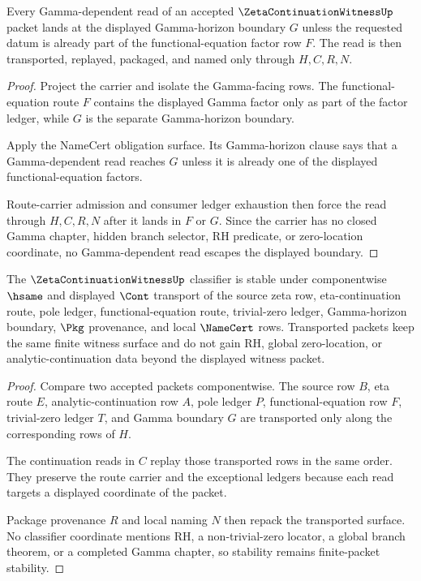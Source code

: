 \begin{theorem}
\label{thm:zeta-continuation-witness-gamma-horizon-nonescape-row}
Every Gamma-dependent read of an accepted $\ZetaContinuationWitnessUp$ packet lands at the displayed Gamma-horizon boundary $G$ unless the requested datum is already part of the functional-equation factor row $F$. The read is then transported, replayed, packaged, and named only through $H,C,R,N$.
\end{theorem}
\begin{proof}
Project the carrier and isolate the Gamma-facing rows. The functional-equation route $F$ contains the displayed Gamma factor only as part of the factor ledger, while $G$ is the separate Gamma-horizon boundary.

Apply the NameCert obligation surface. Its Gamma-horizon clause says that a Gamma-dependent read reaches $G$ unless it is already one of the displayed functional-equation factors.

Route-carrier admission and consumer ledger exhaustion then force the read through $H,C,R,N$ after it lands in $F$ or $G$. Since the carrier has no closed Gamma chapter, hidden branch selector, RH predicate, or zero-location coordinate, no Gamma-dependent read escapes the displayed boundary.
\end{proof}

\begin{theorem}
\label{thm:zeta-continuation-witness-classifier-stability}
The $\ZetaContinuationWitnessUp$ classifier is stable under componentwise $\hsame$ and displayed $\Cont$ transport of the source zeta row, eta-continuation route, pole ledger, functional-equation route, trivial-zero ledger, Gamma-horizon boundary, $\Pkg$ provenance, and local $\NameCert$ rows. Transported packets keep the same finite witness surface and do not gain RH, global zero-location, or analytic-continuation data beyond the displayed witness packet.
\end{theorem}
\begin{proof}
Compare two accepted packets componentwise. The source row $B$, eta route $E$, analytic-continuation row $A$, pole ledger $P$, functional-equation row $F$, trivial-zero ledger $T$, and Gamma boundary $G$ are transported only along the corresponding rows of $H$.

The continuation reads in $C$ replay those transported rows in the same order. They preserve the route carrier and the exceptional ledgers because each read targets a displayed coordinate of the packet.

Package provenance $R$ and local naming $N$ then repack the transported surface. No classifier coordinate mentions RH, a non-trivial-zero locator, a global branch theorem, or a completed Gamma chapter, so stability remains finite-packet stability.
\end{proof}

